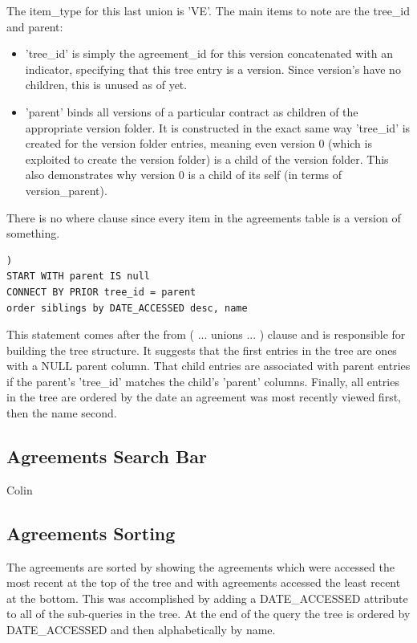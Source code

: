 \documentclass{report}
\begin{document}
The item\_type for this last union is 'VE'.  The main items to note are the tree\_id and parent:

\begin{itemize}
	\item 'tree\_id' is simply the agreement\_id for this version concatenated with an indicator, specifying that this tree entry is a version.  Since version's have no children, this is unused as of yet.
	\item 'parent' binds all versions of a particular contract as children of the appropriate version folder.  It is constructed in the exact same way 'tree\_id' is created for the version folder entries, meaning even version 0 (which is exploited to create the version folder) is a child of the version folder.  This also demonstrates why version 0 is a child of its self (in terms of version\_parent).
\end{itemize}

There is no where clause since every item in the agreements table is a version of something.

\begin{lstlisting}[caption=final pieces of the initial select statement creating the tree structure.]
)
START WITH parent IS null
CONNECT BY PRIOR tree_id = parent
order siblings by DATE_ACCESSED desc, name
\end{lstlisting}

This statement comes after the from ( ... unions ... ) clause and is responsible for building the tree structure.  It suggests that the first entries in the tree are ones with a NULL parent column.  That child entries are associated with parent entries if the parent's 'tree\_id' matches the child's 'parent' columns.  Finally, all entries in the tree are ordered by the date an agreement was most recently viewed first, then the name second.

\subsection{Agreements Search Bar}
Colin 

\subsection{Agreements Sorting}
The agreements are sorted by showing the agreements which were accessed the most recent at the top of the tree and with agreements accessed the least recent at the bottom. This was accomplished by adding a DATE\_ACCESSED attribute to all of the sub-queries in the tree. At the end of the query the tree is ordered by DATE\_ACCESSED and then alphabetically by name. 
\end{document}
